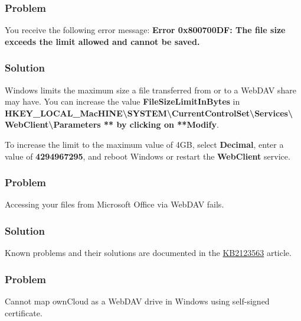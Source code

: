 \documentclass[letterpaper,10pt,english]{sphinxmanual}
\begin{document}
\subsubsection{Problem}
\label{files/access_webdav:id4}\label{files/access_webdav:winhttp}
You receive the following error message: \textbf{Error 0x800700DF: The file size
exceeds the limit allowed and cannot be saved.}


\subsubsection{Solution}
\label{files/access_webdav:id5}
Windows limits the maximum size a file transferred from or to  a WebDAV share
may have.  You can increase the value \textbf{FileSizeLimitInBytes} in
\textbf{HKEY\_LOCAL\_MacHINE\textbackslash{}SYSTEM\textbackslash{}CurrentControlSet\textbackslash{}Services\textbackslash{}WebClient\textbackslash{}Parameters
** by clicking on **Modify}.

To increase the limit to the maximum value of 4GB, select \textbf{Decimal}, enter a
value of \textbf{4294967295}, and reboot Windows or restart the \textbf{WebClient}
service.


\subsubsection{Problem}
\label{files/access_webdav:id6}
Accessing your files from Microsoft Office via WebDAV fails.


\subsubsection{Solution}
\label{files/access_webdav:id7}
Known problems and their solutions are documented in the \href{https://support.microsoft.com/kb/2123563}{KB2123563} article.


\subsubsection{Problem}
\label{files/access_webdav:id8}
Cannot map ownCloud as a WebDAV drive in Windows using self-signed certificate.
\end{document}
